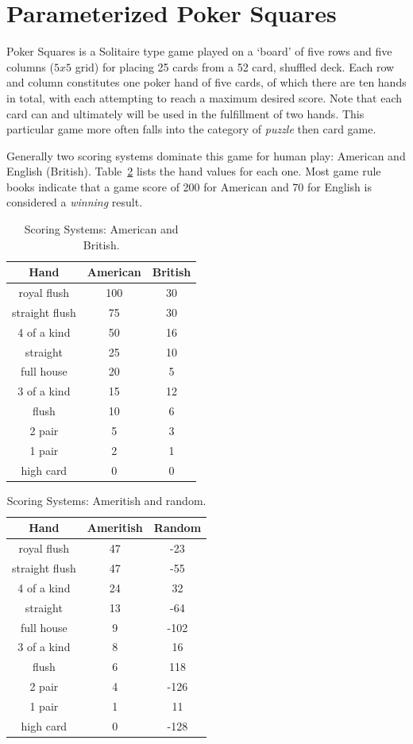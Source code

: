 \documentclass[letterpaper]{article}
\begin{document}
\section{Parameterized Poker Squares}

Poker Squares is a Solitaire type game played on a `board' of five rows and five columns ($5 x 5$ grid) for placing 25 cards from a 52 card, shuffled deck. Each row and column constitutes one poker hand of five cards, of which there are ten hands in total, with each attempting to reach a maximum desired score. Note that each card can and ultimately will be used in the fulfillment of two hands. This particular game more often falls into the category of  \emph{puzzle} then card game.

Generally two scoring systems dominate this game for human play: American and English (British). Table~\ref{tbl:SSAMBR} lists the hand values for each one. Most game rule books indicate that a game score of 200 for American and 70 for English is considered a \emph{winning} result.

\begin{table}[b]
\caption{Scoring Systems: American and British.}
\label{tbl:SSAMBR}
\centering
\begin{tabular}{c c c}
\hline
Hand & American & British \\
\hline
royal flush & 100 & 30 \\
straight flush & 75 & 30 \\
4 of a kind & 50 & 16 \\
straight & 25 & 10 \\
full house & 20 & 5 \\
3 of a kind & 15 & 12 \\
flush & 10 & 6 \\
2 pair & 5 & 3 \\
1 pair & 2 & 1 \\
high card & 0 & 0 \\
\hline
\end{tabular}
\end{table}

\begin{table}
\caption{Scoring Systems: Ameritish and random.}
\label{tbl:SSAMBR}
\centering
\begin{tabular}{c c c}
\hline
Hand & Ameritish & Random \\
\hline
royal flush & 47 & -23 \\
straight flush & 47 & -55 \\
4 of a kind & 24 & 32 \\
straight & 13 & -64 \\
full house & 9 & -102 \\
3 of a kind & 8 & 16 \\
flush & 6 & 118 \\
2 pair & 4 & -126 \\
1 pair & 1 & 11 \\
high card & 0 & -128 \\
\hline
\end{tabular}
\end{table}
\end{document}
